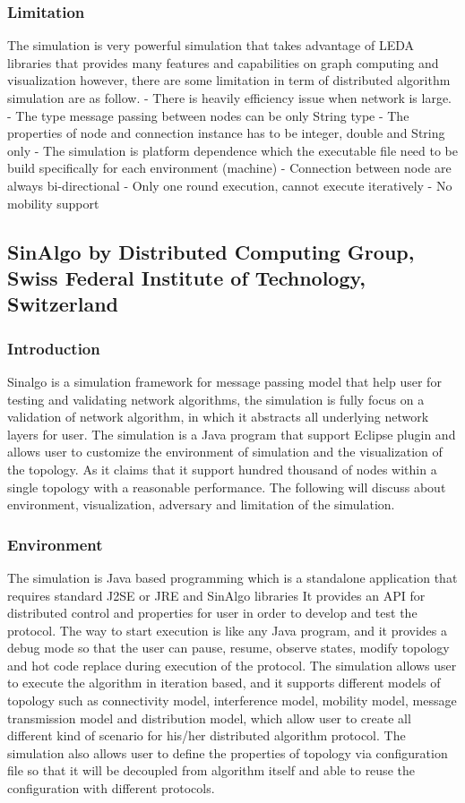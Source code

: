 \subsubsection{Limitation}
The simulation is very powerful simulation that takes advantage of LEDA libraries that provides many features and capabilities on graph computing and visualization however, there are some limitation in term of distributed algorithm simulation are as follow.
- There is heavily efficiency issue when network is large.
- The type message passing between nodes can be only String type
- The properties of node and connection instance has to be integer, double and String only
- The simulation is platform dependence which the executable file need to be build specifically for each environment (machine)
- Connection between node are always bi-directional
- Only one round execution, cannot execute iteratively
- No mobility support



\subsection{SinAlgo by Distributed Computing Group, Swiss Federal Institute of Technology, Switzerland}

\subsubsection{Introduction}
Sinalgo is a simulation framework for message passing model that help user for testing and validating network algorithms, the simulation is fully focus on a validation of network algorithm, in which it abstracts all underlying network layers for user. The simulation is a Java program that  support Eclipse plugin and allows user to customize the environment of simulation and the visualization of the topology. As it claims that it support hundred thousand of nodes within a single topology with a reasonable performance. The following will discuss about environment, visualization, adversary and limitation of the simulation.

\subsubsection{Environment}
The simulation is Java based programming which is a standalone application that requires standard J2SE or JRE and SinAlgo libraries It provides an API for distributed control and properties for user in order to develop and test the protocol. The way to start execution is like any Java program, and it provides a debug mode so that the user can pause, resume, observe states, modify topology and hot code replace during execution of the protocol. The simulation allows user to execute the algorithm in iteration based, and it supports different models of topology such as connectivity model, interference model, mobility model, message transmission model and distribution model, which allow user to create all different kind of scenario for his/her distributed algorithm protocol. The simulation also allows user to define the properties of topology via configuration file so that it will be decoupled from algorithm itself and able to reuse the configuration with different protocols.

